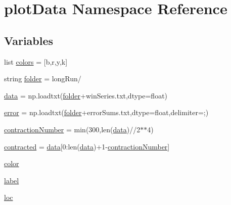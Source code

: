 \hypertarget{namespaceplot_data}{}\section{plot\+Data Namespace Reference}
\label{namespaceplot_data}
\subsection*{Variables}
\begin{DoxyCompactItemize}
\item 
list \hyperlink{namespaceplot_data_a3973b174067454c6d6fb4a100600574b}{colors} = \mbox{[}\textquotesingle{}b\textquotesingle{},\textquotesingle{}r\textquotesingle{},\textquotesingle{}y\textquotesingle{},\textquotesingle{}k\textquotesingle{}\mbox{]}
\item 
string \hyperlink{namespaceplot_data_acefbb49a026077f724500d7c511fb59e}{folder} = \textquotesingle{}long\+Run/\textquotesingle{}
\item 
\hyperlink{namespaceplot_data_a44c9f3af3147f385257597dd63d09e3a}{data} = np.\+loadtxt(\hyperlink{namespaceplot_data_acefbb49a026077f724500d7c511fb59e}{folder}+\textquotesingle{}win\+Series.\+txt\textquotesingle{},dtype=float)
\item 
\hyperlink{namespaceplot_data_a654ab80d46bf5af451e1ca85b1dcb573}{error} = np.\+loadtxt(\hyperlink{namespaceplot_data_acefbb49a026077f724500d7c511fb59e}{folder}+\textquotesingle{}error\+Sums.\+txt\textquotesingle{},dtype=float,delimiter=\textquotesingle{};\textquotesingle{})
\item 
\hyperlink{namespaceplot_data_af459551cfb398cc731a4c51c4d44df41}{contraction\+Number} = min(300,len(\hyperlink{namespaceplot_data_a44c9f3af3147f385257597dd63d09e3a}{data})//2$\ast$$\ast$4)
\item 
\hyperlink{namespaceplot_data_a82986c14482fcee60f04f418a09ca49c}{contracted} = \hyperlink{namespaceplot_data_a44c9f3af3147f385257597dd63d09e3a}{data}\mbox{[}0\+:len(\hyperlink{namespaceplot_data_a44c9f3af3147f385257597dd63d09e3a}{data})+1-\/\hyperlink{namespaceplot_data_af459551cfb398cc731a4c51c4d44df41}{contraction\+Number}\mbox{]}
\item 
\hyperlink{namespaceplot_data_a0bf3fb4a650e2f9eea6c07f84bfd3745}{color}
\item 
\hyperlink{namespaceplot_data_a13e86a1d4baebb88c13b21cf4a6e474f}{label}
\item 
\hyperlink{namespaceplot_data_a3bb3a1ce0591a27573ad339091687219}{loc}
\end{DoxyCompactItemize}



